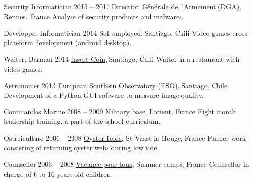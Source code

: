 \begin{joblist}[13.2][7.8][3.5]


\item[Security Informatician]{2015 -- 2017}
	{
	\href{http://www.defense.gouv.fr/dga/}{Direction Générale de l'Armement (DGA)}, Rennes, France
	}
	{Analyse of security products and malwares.}


\item[Developper Informatician]{2014}
	{
	\href{https://play.google.com/store/apps/developer?id=tinmarino&hl=en}{Self-employed}, Santiago, Chili
	}
	{Video games cross-plateform development (android desktop).}


\item[Waiter, Barman]{2014}
	{
	\href{http://www.insertcoin.cl/}{Insert-Coin}, Santiago, Chili
	}
	{Waiter in a restaurant with video games.}


\item[Astronomer]{2013}
	{
	\href{http://www.eso.org/public/}{European Southern Observatory (ESO)}, Santiago, Chile
	}
	{Development of a Python GUI software to measure image quality.}

	
\item[Commandos Marine]{2008 -- 2009}
	{
	\href{http://www.defense.gouv.fr/marine/organisation/forces/fusiliers-marins-et-commandos/force-maritime-des-fusiliers-marins-et-commandos}{Military base}, Lorient, France
	}
	{Eight ­month leadership training, a part of the school curriculum.}


\item[Ostreiculture]{2006 -- 2008}
	{
	\href{http://huitresdesaintvaast.fr/}{Oyster fields}, St Vaast la Houge, France
	}
	{Farmer work consisting of returning oyster webs during low tide.}


\item[Counsellor]{2006 -- 2008}
	{
	\href{http://www.vacances-pour-tous.org/}{Vacance pour tous}, Summer camps, France
	}
	{Counsellor in charge of 6 to 16 years old children.}
	
	
\end{joblist}


